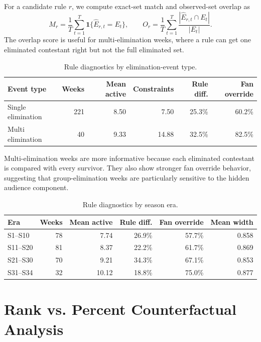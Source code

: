 \documentclass[12pt]{article}
\begin{document}
For a candidate rule $r$, we compute exact-set match and observed-set overlap as
\[
  M_r=\frac{1}{T}\sum_{t=1}^{T}\mathbf{1}\{\widehat E_{r,t}=E_t\},
  \qquad
  O_r=\frac{1}{T}\sum_{t=1}^{T}\frac{|\widehat E_{r,t}\cap E_t|}{|E_t|}.
\]
The overlap score is useful for multi-elimination weeks, where a rule can get
one eliminated contestant right but not the full eliminated set.

\begin{table}[!htbp]
  \centering
  \caption{Rule diagnostics by elimination-event type.}
  \label{tab:event-type}
  \begin{tabular}{lrrrrr}
    \toprule
    Event type & Weeks & Mean active & Constraints & Rule diff. & Fan override \\
    \midrule
    Single elimination & 221 & 8.50 & 7.50 & 25.3\% & 60.2\% \\
    Multi elimination & 40 & 9.33 & 14.88 & 32.5\% & 82.5\% \\
    \bottomrule
  \end{tabular}
\end{table}

Multi-elimination weeks are more informative because each eliminated
contestant is compared with every survivor. They also show stronger fan
override behavior, suggesting that group-elimination weeks are particularly
sensitive to the hidden audience component.

\begin{table}[!htbp]
  \centering
  \caption{Rule diagnostics by season era.}
  \label{tab:era-summary}
  \begin{tabular}{lrrrrr}
    \toprule
    Era & Weeks & Mean active & Rule diff. & Fan override & Mean width \\
    \midrule
    S1--S10 & 78 & 7.74 & 26.9\% & 57.7\% & 0.858 \\
    S11--S20 & 81 & 8.37 & 22.2\% & 61.7\% & 0.869 \\
    S21--S30 & 70 & 9.21 & 34.3\% & 67.1\% & 0.853 \\
    S31--S34 & 32 & 10.12 & 18.8\% & 75.0\% & 0.877 \\
    \bottomrule
  \end{tabular}
\end{table}

\section{Rank vs. Percent Counterfactual Analysis}
\end{document}
